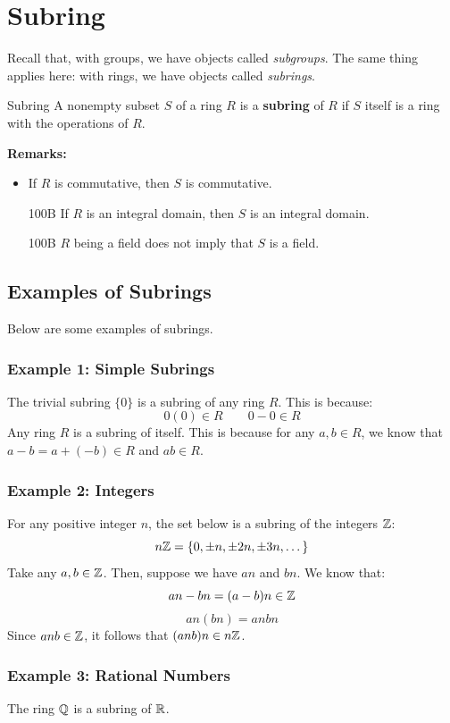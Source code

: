 \documentclass[letterpaper]{article}
\begin{document}
\newpage 
\section{Subring}
Recall that, with groups, we have objects called \emph{subgroups}. The same thing applies here: with rings, we have objects called \emph{subrings}.
\begin{definition}{Subring}{}
    A nonempty subset $S$ of a ring $R$ is a \textbf{subring} of $R$ if $S$ itself is a ring with the operations of $R$.
\end{definition}
\textbf{Remarks:}
\begin{itemize} 
    \item If $R$ is commutative, then $S$ is commutative.
    \item [100B] If $R$ is an integral domain, then $S$ is an integral domain. 
    \item [100B] $R$ being a field does not imply that $S$ is a field. 
\end{itemize}

\subsection{Examples of Subrings}
Below are some examples of subrings. 

\subsubsection{Example 1: Simple Subrings}
The trivial subring $\{0\}$ is a subring of any ring $R$. This is because:
\[0(0) \in R \qquad 0 - 0 \in R\]
Any ring $R$ is a subring of itself. This is because for any $a, b \in R$, we know that $a - b = a + (-b) \in R$ and $ab \in R$. 

\subsubsection{Example 2: Integers}
For any positive integer $n$, the set below is a subring of the integers $\mathbb{Z}$: 
\[n\mathbb{Z} = \{0, \pm n, \pm 2n, \pm 3n, \dots\}\]
Take any $a, b \in \mathbb{Z}$. Then, suppose we have $an$ and $bn$. We know that: 
\[an - bn = (a - b)n \in \mathbb{Z}\]
\[an(bn) = anbn\]
Since $anb \in \mathbb{Z}$, it follows that $(anb)n \in n\mathbb{Z}$. 

\subsubsection{Example 3: Rational Numbers}
The ring $\mathbb{Q}$ is a subring of $\mathbb{R}$. 
\end{document}
